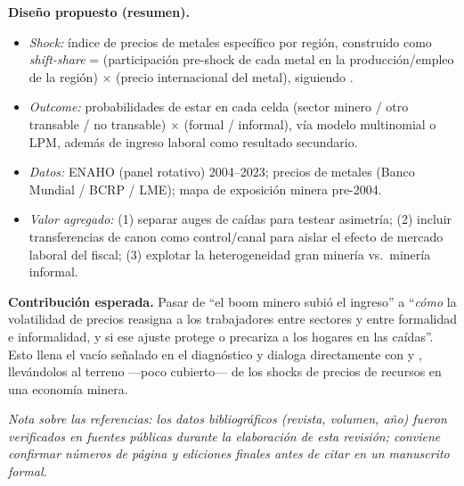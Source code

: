 \documentclass[11pt]{article}
\begin{document}
\noindent\textbf{Diseño propuesto (resumen).}
\begin{itemize}[leftmargin=1.4em]
  \item \emph{Shock:} índice de precios de metales específico por región, construido como
  \textit{shift-share} = (participación pre-shock de cada metal en la producción/empleo de la
  región) $\times$ (precio internacional del metal), siguiendo \citet{borusyak2022}.
  \item \emph{Outcome:} probabilidades de estar en cada celda (sector minero / otro transable
  / no transable) $\times$ (formal / informal), vía modelo multinomial o LPM, además de
  ingreso laboral como resultado secundario.
  \item \emph{Datos:} ENAHO (panel rotativo) 2004--2023; precios de metales (Banco Mundial /
  BCRP / LME); mapa de exposición minera pre-2004.
  \item \emph{Valor agregado:} (1) separar auges de caídas para testear asimetría; (2) incluir
  transferencias de canon como control/canal para aislar el efecto de mercado laboral del
  fiscal; (3) explotar la heterogeneidad gran minería vs.\ minería informal.
\end{itemize}

\noindent\textbf{Contribución esperada.} Pasar de ``el boom minero subió el ingreso'' a
``\emph{cómo} la volatilidad de precios reasigna a los trabajadores entre sectores y entre
formalidad e informalidad, y si ese ajuste protege o precariza a los hogares en las caídas''.
Esto llena el vacío señalado en el diagnóstico y dialoga directamente con
\citet{dixcarneiro2017} y \citet{benguria2024}, llevándolos al terreno —poco cubierto— de los
shocks de precios de recursos en una economía minera.

\bigskip
\noindent\textit{Nota sobre las referencias: los datos bibliográficos (revista, volumen, año)
fueron verificados en fuentes públicas durante la elaboración de esta revisión; conviene
confirmar números de página y ediciones finales antes de citar en un manuscrito formal.}
\end{document}

